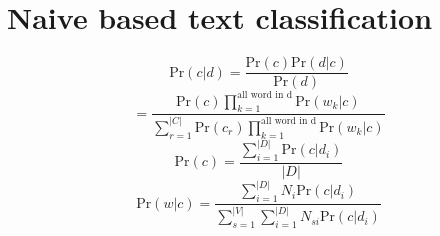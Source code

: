 \documentclass[10pt,oneside,a4paper]{article}
\begin{document}
\section{Naive based text classification}
\[
    \text{Pr}(c | d) = \frac{\text{Pr}(c) \text{Pr}(d|c)}{\text{Pr}(d)}
\]
\[
    = \frac{\text{Pr}(c) \prod_{k=1}^{\text{all word in d}} \text{Pr}(w_k|c)}{\sum_{r=1}^{|C|} \text{Pr}(c_r) \prod_{k=1}^{\text{all word in d}} \text{Pr}(w_k|c)}
\]
\[
    \text{Pr}(c) = \frac{\sum_{i=1}^{|D|} \text{Pr}(c|d_i)}{|D|}
\]
\[
    \text{Pr}(w|c) = \frac{\sum_{i=1}^{|D|} N_{i} \text{Pr}(c|d_i)}{\sum_{s=1}^{|V|} \sum_{i=1}^{|D|} N_{si} \text{Pr}(c|d_i)}
\]







\end{document}
